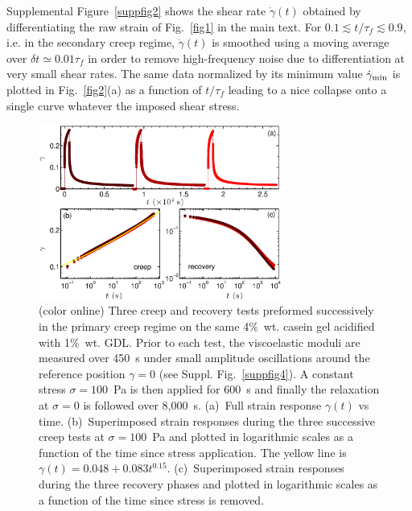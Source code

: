 \documentclass[twocolumn,superscriptaddress,showpacs,preprintnumbers,amsmath,amssymb,prl]{revtex4}
\newcommand\gp{\dot\gamma}
\begin{document}
Supplemental Figure~\ref{suppfig2} shows the shear rate $\gp(t)$ obtained by differentiating the raw strain of Fig.~\ref{fig1} in the main text. For $0.1\lesssim t/\tau_f\lesssim 0.9$, i.e. in the secondary creep regime, $\gp(t)$ is smoothed using a moving average over $\delta t\simeq 0.01\tau_f$ in order to remove high-frequency noise due to differentiation at very small shear rates. The same data normalized by its minimum value $\gp_{\rm min}$ is plotted in Fig.~\ref{fig2}(a) as a function of $t/\tau_f$ leading to a nice collapse onto a single curve whatever the imposed shear stress.

\clearpage
\newpage

\begin{figure}
\centering
\includegraphics[width=8cm,clip]{SuppFig3.eps}
\caption{(color online) Three creep and recovery tests preformed successively in the primary creep regime on the same 4\%~wt. casein gel acidified with 1\%~wt. GDL. Prior to each test, the viscoelastic moduli are measured over 450~s under small amplitude oscillations around the reference position $\gamma=0$ (see Suppl. Fig.~\ref{suppfig4}). A constant stress $\sigma=100$~Pa is then applied for 600~s and finally the relaxation at $\sigma=0$ is followed over 8,000~s. (a)~Full strain response $\gamma(t)$ vs time. (b)~Superimposed strain responses during the three successive creep tests at $\sigma=100$~Pa and plotted in logarithmic scales as a function of the time since stress application. The yellow line is $\gamma(t)= 0.048+0.083 t^{0.15}$. (c)~Superimposed strain responses during the three recovery phases and plotted in logarithmic scales as a function of the time since stress is removed.
\label{suppfig3}}
\end{figure} 
\end{document}
